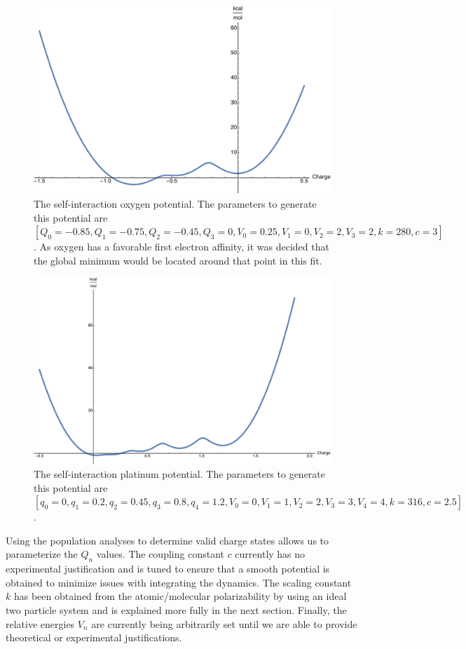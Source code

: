 \begin{figure}
  \centering
  \includegraphics[width=0.75\linewidth]{../figures/chap5/Oxygen_Charge_Testing.pdf}
  \caption{The self-interaction oxygen potential. The parameters to
generate this potential are $[Q_0 = -0.85, Q_1 = -0.75, Q_2 = -0.45, Q_3 = 0,
V_0 = 0.25, V_1 = 0, V_2 = 2, V_3 = 2, k = 280, c = 3]$. As oxygen has a
favorable first electron affinity, it was decided that the global minimum
would be located around that point in this fit.}
\label{fig:Ocharge}
\end{figure}

\begin{figure}
  \centering
  \includegraphics[width=0.75\linewidth]{../figures/chap5/Pt_Charge_Testing.pdf}
  \caption{The self-interaction platinum potential. The parameters to
generate this potential are $[q_0 = 0, q_1 = 0.2, q_2 = 0.45, q_3 = 0.8, q_4 =
1.2, V_0 = 0, V_1 = 1, V_2 = 2, V_3 = 3, V_4 = 4, k = 316, c = 2.5]$.}
\label{fig:PtCharge}
\end{figure}

Using the population analyses to determine valid charge states allows us to
parameterize the $Q_n$ values. The coupling constant $c$ currently has no
experimental justification and is tuned to ensure that a smooth potential is
obtained to minimize issues with integrating the dynamics. The scaling constant
$k$ has been obtained from the atomic/molecular polarizability by using an
ideal two particle system and is explained more fully in the next section.
Finally, the relative energies $V_n$ are currently being arbitrarily set until
we are able to provide theoretical or experimental justifications.

